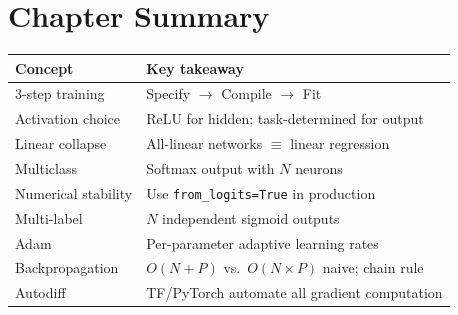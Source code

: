 \section*{Chapter Summary}

\begin{center}
\begin{tabular}{ll}
\toprule
\textbf{Concept} & \textbf{Key takeaway}\\
\midrule
3-step training      & Specify $\to$ Compile $\to$ Fit\\
Activation choice    & ReLU for hidden; task-determined for output\\
Linear collapse      & All-linear networks $\equiv$ linear regression\\
Multiclass           & Softmax output with $N$ neurons\\
Numerical stability  & Use \texttt{from\_logits=True} in production\\
Multi-label          & $N$ independent sigmoid outputs\\
Adam                 & Per-parameter adaptive learning rates\\
Backpropagation      & $O(N+P)$ vs.\ $O(N\times P)$ naive; chain rule\\
Autodiff             & TF/PyTorch automate all gradient computation\\
\bottomrule
\end{tabular}
\end{center}
